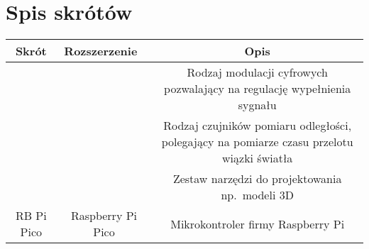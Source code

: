 \section*{Spis skrótów}
\begin{table*}[!ht]
    \begin{tabularx}{\textwidth}{|c|C|C|}\hline
        Skrót & Rozszerzenie\ & Opis\\\hline
         &  & Rodzaj modulacji cyfrowych pozwalający na regulację wypełnienia sygnału\\\hline
         &  & Rodzaj czujników pomiaru odległości, polegający na pomiarze czasu przelotu wiązki światła\\\hline
         &  & Zestaw narzędzi do projektowania np.~modeli 3D\\\hline
        RB Pi Pico & Raspberry Pi Pico & Mikrokontroler firmy Raspberry Pi\\\hline
    \end{tabularx}
\end{table*}